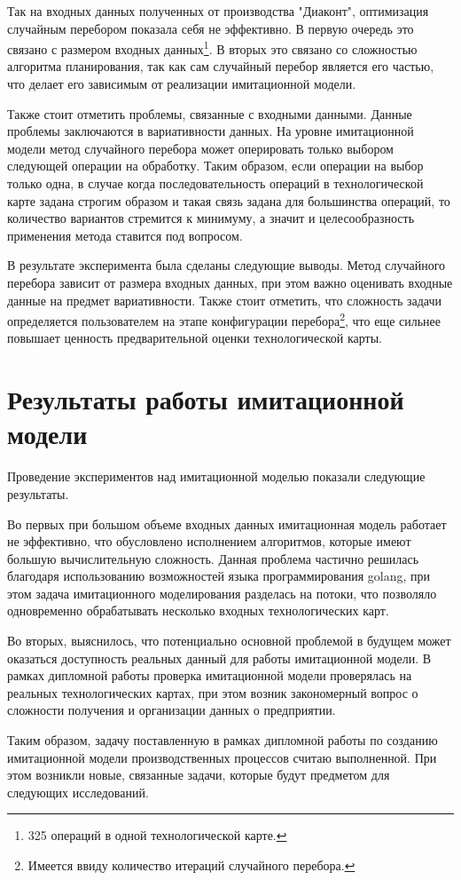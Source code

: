 Так на входных данных полученных от производства "Диаконт", оптимизация случайным перебором показала себя не эффективно. В первую очередь это связано с размером входных данных\footnote{325 операций в одной технологической карте.}. В вторых это связано со сложностью алгоритма планирования, так как сам случайный перебор является его частью, что делает его зависимым от реализации имитационной модели.

Также стоит отметить проблемы, связанные с входными данными. Данные проблемы заключаются в вариативности данных. На уровне имитационной модели метод случайного перебора может оперировать только выбором следующей операции на обработку. Таким образом, если операции на выбор только одна, в случае когда последовательность операций в технологической карте задана строгим образом и такая связь задана для большинства операций, то количество вариантов стремится к минимуму, а значит и целесообразность применения метода ставится под вопросом.

В результате эксперимента была сделаны следующие выводы. Метод случайного перебора зависит от размера входных данных, при этом важно оценивать входные данные на предмет вариативности. Также стоит отметить, что сложность задачи определяется пользователем на этапе конфигурации перебора\footnote{Имеется ввиду количество итераций случайного перебора.}, что еще сильнее повышает ценность предварительной оценки технологической карты.

\section{Результаты работы имитационной модели}

Проведение экспериментов над имитационной моделью показали следующие результаты.

Во первых при большом объеме входных данных имитационная модель работает не эффективно, что обусловлено исполнением алгоритмов, которые имеют большую вычислительную сложность.
Данная проблема частично решилась благодаря использованию возможностей языка программирования golang, при этом задача имитационного моделирования разделась на потоки, что позволяло одновременно обрабатывать несколько входных технологических карт.

Во вторых, выяснилось, что потенциально основной проблемой в будущем может оказаться доступность реальных данный для работы имитационной модели.
В рамках дипломной работы проверка имитационной модели проверялась на реальных технологических картах, при этом возник закономерный вопрос о сложности получения и организации данных о предприятии. 

Таким образом, задачу поставленную в рамках дипломной работы по созданию имитационной модели производственных процессов считаю выполненной. 
При этом возникли новые, связанные задачи, которые будут предметом для следующих исследований.